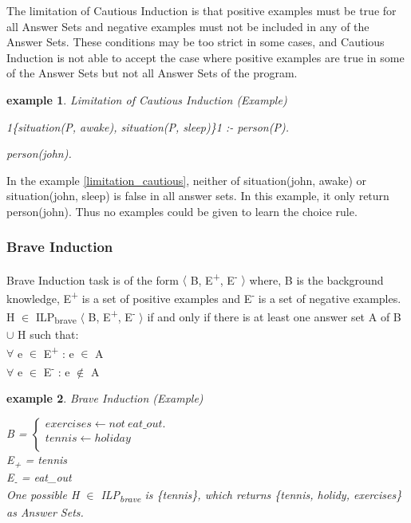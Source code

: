 \documentclass[12pt,twoside]{report}
\newtheorem{examp}{example}[section]
\begin{document}
The limitation of Cautious Induction is that positive examples must be true for all Answer Sets and negative examples must not be included in any of the Answer Sets. These conditions may be too strict in some cases, and Cautious Induction is not able to accept the case where positive examples are true in some of the Answer Sets but not all Answer Sets of the program.

\begin{examp} \normalfont Limitation of Cautious Induction (Example)

1\{situation(P, awake), situation(P, sleep)\}1 :- person(P).

person(john).

\end{examp}
\label{limitation_cautious}

In the example \ref{limitation_cautious}, neither of situation(john, awake) or situation(john, sleep) is false in all answer sets. In this example, it only return person(john). Thus no examples could be given to learn the choice rule.

\subsubsection{Brave Induction}
Brave Induction task is of the form $\langle$ B, E\textsuperscript{+}, E\textsuperscript{-} $\rangle$ where, B is the background knowledge, E\textsuperscript{+} is a set of positive examples and E\textsuperscript{-} is a set of negative examples.
 H $\in$ ILP\textsubscript{brave} $\langle$ B, E\textsuperscript{+}, E\textsuperscript{-} $\rangle$ if and only if there is at least one answer set A of B $\cup$ H such that: \\
$\forall$ e $\in$ E\textsuperscript{+} : e $\in$ A \\
$\forall$ e $\in$ E\textsuperscript{-} : e $\notin$ A \\

\begin{examp} \normalfont Brave Induction (Example)

B = $\begin{cases}
	exercises  \leftarrow not \ eat\_out. \\
	tennis \leftarrow holiday \\
      \end{cases}$ \\
E\textsubscript{+} = tennis \\
E\textsubscript{-} = eat\_out \\
One possible  H $\in$ ILP\textsubscript{brave} is \{tennis\}, which returns \{tennis, holidy, exercises\} as Answer Sets.
\end{examp}
\label{brave_induction_example}
\end{document}
